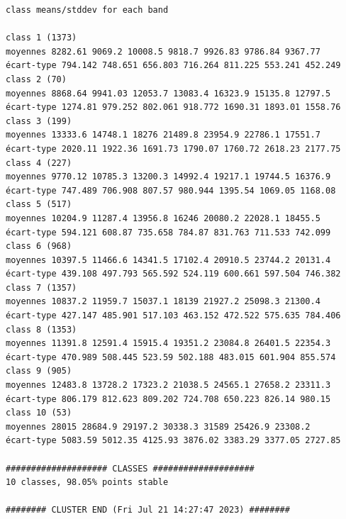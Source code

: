\documentclass[land,article,submit,pdftex,moreauthors]{Definitions/mdpi}
\begin{document}
\begin{scriptsize}
\begin{verbatim}
class means/stddev for each band

class 1 (1373)
moyennes 8282.61 9069.2 10008.5 9818.7 9926.83 9786.84 9367.77
écart-type 794.142 748.651 656.803 716.264 811.225 553.241 452.249
class 2 (70)
moyennes 8868.64 9941.03 12053.7 13083.4 16323.9 15135.8 12797.5
écart-type 1274.81 979.252 802.061 918.772 1690.31 1893.01 1558.76
class 3 (199)
moyennes 13333.6 14748.1 18276 21489.8 23954.9 22786.1 17551.7
écart-type 2020.11 1922.36 1691.73 1790.07 1760.72 2618.23 2177.75
class 4 (227)
moyennes 9770.12 10785.3 13200.3 14992.4 19217.1 19744.5 16376.9
écart-type 747.489 706.908 807.57 980.944 1395.54 1069.05 1168.08
class 5 (517)
moyennes 10204.9 11287.4 13956.8 16246 20080.2 22028.1 18455.5
écart-type 594.121 608.87 735.658 784.87 831.763 711.533 742.099
class 6 (968)
moyennes 10397.5 11466.6 14341.5 17102.4 20910.5 23744.2 20131.4
écart-type 439.108 497.793 565.592 524.119 600.661 597.504 746.382
class 7 (1357)
moyennes 10837.2 11959.7 15037.1 18139 21927.2 25098.3 21300.4
écart-type 427.147 485.901 517.103 463.152 472.522 575.635 784.406
class 8 (1353)
moyennes 11391.8 12591.4 15915.4 19351.2 23084.8 26401.5 22354.3
écart-type 470.989 508.445 523.59 502.188 483.015 601.904 855.574
class 9 (905)
moyennes 12483.8 13728.2 17323.2 21038.5 24565.1 27658.2 23311.3
écart-type 806.179 812.623 809.202 724.708 650.223 826.14 980.15
class 10 (53)
moyennes 28015 28684.9 29197.2 30338.3 31589 25426.9 23308.2
écart-type 5083.59 5012.35 4125.93 3876.02 3383.29 3377.05 2727.85

#################### CLASSES ####################
10 classes, 98.05% points stable

######## CLUSTER END (Fri Jul 21 14:27:47 2023) ########
\end{verbatim}
\end{scriptsize}
\end{document}
